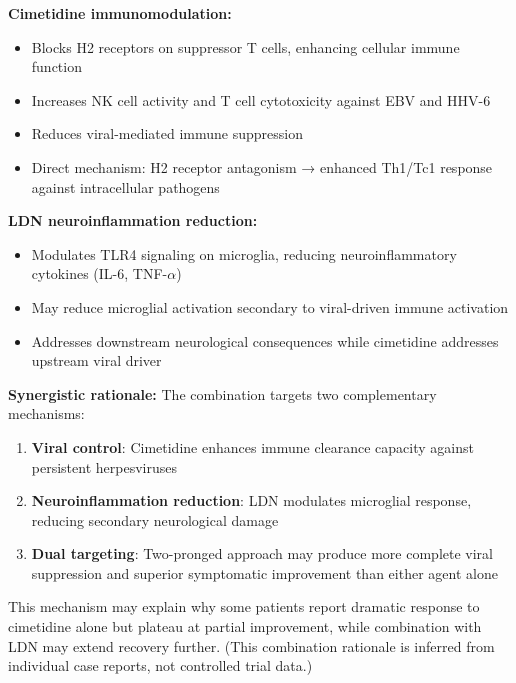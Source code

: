 \begin{hypothesis}
\label{hyp:cimetidine-ldn-mechanism}

\textbf{Cimetidine immunomodulation:}
\begin{itemize}
    \item Blocks H2 receptors on suppressor T cells, enhancing cellular immune function
    \item Increases NK cell activity and T cell cytotoxicity against EBV and HHV-6
    \item Reduces viral-mediated immune suppression
    \item Direct mechanism: H2 receptor antagonism → enhanced Th1/Tc1 response against intracellular pathogens
\end{itemize}

\textbf{LDN neuroinflammation reduction:}
\begin{itemize}
    \item Modulates TLR4 signaling on microglia, reducing neuroinflammatory cytokines (IL-6, TNF-$\alpha$)
    \item May reduce microglial activation secondary to viral-driven immune activation
    \item Addresses downstream neurological consequences while cimetidine addresses upstream viral driver
\end{itemize}

\textbf{Synergistic rationale:}
The combination targets two complementary mechanisms:
\begin{enumerate}
    \item \textbf{Viral control}: Cimetidine enhances immune clearance capacity against persistent herpesviruses
    \item \textbf{Neuroinflammation reduction}: LDN modulates microglial response, reducing secondary neurological damage
    \item \textbf{Dual targeting}: Two-pronged approach may produce more complete viral suppression and superior symptomatic improvement than either agent alone
\end{enumerate}

This mechanism may explain why some patients report dramatic response to cimetidine alone but plateau at partial improvement, while combination with LDN may extend recovery further. (This combination rationale is inferred from individual case reports, not controlled trial data.)

\end{hypothesis}

